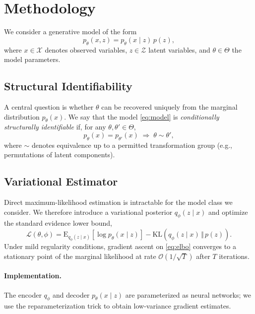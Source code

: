 \section{Methodology}\label{sec:methodology}
We consider a generative model of the form
\begin{equation}\label{eq:model}
  p_\theta(x, z) = p_\theta(x \mid z)\, p(z),
\end{equation}
where \(x \in \mathcal{X}\) denotes observed variables, \(z \in \mathcal{Z}\) latent variables, and \(\theta \in \Theta\) the model parameters.

\subsection{Structural Identifiability}
A central question is whether \(\theta\) can be recovered uniquely from the marginal distribution \(p_\theta(x)\).
We say that the model \eqref{eq:model} is \emph{conditionally structurally identifiable} if, for any \(\theta, \theta' \in \Theta\),
\begin{equation*}
  p_\theta(x) = p_{\theta'}(x) \;\Longrightarrow\; \theta \sim \theta',
\end{equation*}
where \(\sim\) denotes equivalence up to a permitted transformation group (e.g., permutations of latent components).

\subsection{Variational Estimator}
Direct maximum-likelihood estimation is intractable for the model class we consider.
We therefore introduce a variational posterior \(q_\phi(z \mid x)\) and optimize the standard evidence lower bound,
\begin{equation}\label{eq:elbo}
  \mathcal{L}(\theta, \phi) = \mathrm{E}_{q_\phi(z \mid x)}\!\left[\log p_\theta(x \mid z)\right] - \mathrm{KL}\!\left(q_\phi(z \mid x) \,\Vert\, p(z)\right).
\end{equation}
Under mild regularity conditions, gradient ascent on \eqref{eq:elbo} converges to a stationary point of the marginal likelihood at rate \(\mathcal{O}(1/\sqrt{T})\) after \(T\) iterations.

\paragraph{Implementation.}
The encoder \(q_\phi\) and decoder \(p_\theta(x \mid z)\) are parameterized as neural networks; we use the reparameterization trick to obtain low-variance gradient estimates.
